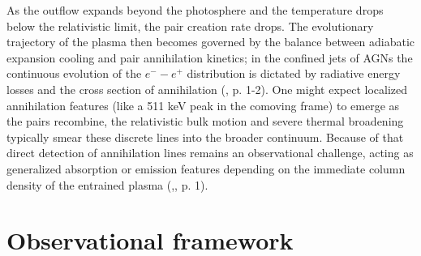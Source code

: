 \documentclass{aa} %
\begin{document}
As the outflow expands beyond the photosphere and the temperature drops below the relativistic limit, the pair creation rate drops. The evolutionary trajectory of the plasma then becomes governed by the balance between adiabatic expansion cooling and pair annihilation kinetics; in the confined jets of AGNs the continuous evolution of the $e^- - e^+$ distribution is dictated by radiative energy losses and the cross section of annihilation (\citet{Boettcheretal1996}, p. 1-2). One might expect localized annihilation features (like a 511 keV peak in the comoving frame) to emerge as the pairs recombine, the relativistic bulk motion and severe thermal broadening typically smear these discrete lines into the broader continuum. Because of that direct detection of annihilation lines remains an observational challenge, acting as generalized absorption or emission features depending on the immediate column density of the entrained plasma (\citet{Boettcheretal1996},\citet{Haileyetal1999}, p. 1).

\section{Observational framework}
\end{document}
